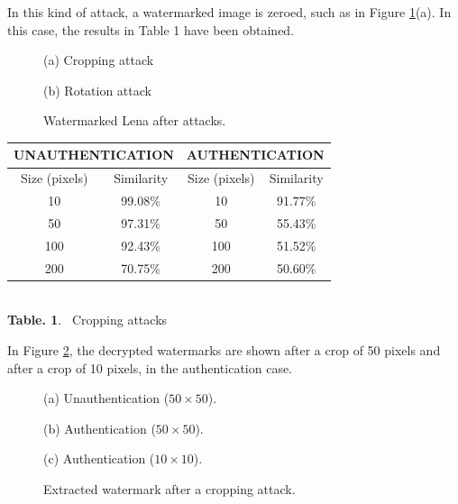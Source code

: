 In this kind of attack, a watermarked image is zeroed, such as in Figure \ref{fig:LenaAttack}(a). In this case, the results in Table 1 have been obtained.

\begin{figure}[htb]
\begin{minipage}[b]{.48\linewidth}
  \centering
 \centerline{}
  \centerline{(a) Cropping attack}
\end{minipage}
\hfill
\begin{minipage}[b]{0.48\linewidth}
  \centering
 \centerline{}
  \centerline{(b) Rotation attack}
\end{minipage}
\caption{Watermarked Lena after attacks.}
\label{fig:LenaAttack}
\end{figure}




\begin{center}
\begin{footnotesize}
\begin{tabular}{|c|c||c|c|}
\hline
\multicolumn{2}{|c||}{UNAUTHENTICATION}  & \multicolumn{2}{c|}{AUTHENTICATION}\\ 
\hline
Size (pixels) & Similarity & Size (pixels) & Similarity \\
 \hline
10 & 99.08\% & 10 & 91.77\% \\
50 & 97.31\% & 50 & 55.43\% \\
100 & 92.43\% & 100 & 51.52\% \\
200 & 70.75\% & 200 & 50.60\% \\
\hline
\end{tabular}
\end{footnotesize}\\
\vspace{0.5cm}
\textbf{Table. 1}. ~Cropping attacks
\end{center}


In Figure \ref{fig:Dechiffrement_invader}, the decrypted watermarks are shown after a crop of 50 pixels and after a crop of 10 pixels, in the authentication case.

\begin{figure}[htb]
\begin{minipage}[b]{1.0\linewidth}
  \centering
 \centerline{}
  \centerline{(a) Unauthentication ($50\times 50$).}
\end{minipage}
%
\begin{minipage}[b]{.48\linewidth}
  \centering
 \centerline{}
  \centerline{(b) Authentication  ($50\times 50$).}
\end{minipage}
\hfill
\begin{minipage}[b]{0.48\linewidth}
  \centering
 \centerline{}
  \centerline{(c) Authentication  ($10\times 10$).}
\end{minipage}
%
\caption{Extracted watermark after a cropping attack.}
\label{fig:Dechiffrement_invader}
%
\end{figure}


